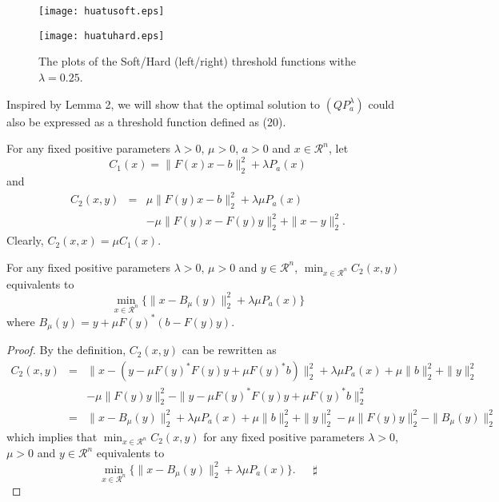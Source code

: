 \documentclass[smallextended]{svjour3}
\begin{document}
\begin{figure}[h!]
  \begin{minipage}[t]{0.5\linewidth}
  \centering
  \texttt{[image: huatusoft.eps]}
  \end{minipage}
  \begin{minipage}[t]{0.5\linewidth}
  \centering
  \texttt{[image: huatuhard.eps]}
  \end{minipage}
  \caption{The plots of the Soft/Hard (left/right) threshold functions withe $\lambda=0.25$.} \label{fig:3}
\end{figure}

Inspired by Lemma 2, we will show that the optimal solution to $(QP_{a}^{\lambda})$ could also be expressed as a threshold
function defined as (20).

For any fixed positive parameters $\lambda>0$, $\mu>0$, $a>0$ and $x\in \mathcal{R}^{n}$, let
\begin{equation}\label{r24}
C_{1}(x)=\|F(x)x-b\|_{2}^{2}+\lambda P_{a}(x)
\end{equation}
and
\begin{equation}\label{r25}
\begin{array}{llll}
C_{2}(x, y)&=&\mu\|F(y)x-b\|_{2}^{2}+\lambda\mu P_{a}(x)\\
&&-\mu\|F(y)x-F(y)y\|_{2}^{2}+\|x-y\|_{2}^{2}.
\end{array}
\end{equation}
Clearly, $C_{2}(x,x)=\mu C_{1}(x)$.
\begin{theorem}\label{th1}
For any fixed positive parameters $\lambda>0$, $\mu>0$ and $y\in \mathcal{R}^{n}$, $\displaystyle\min_{x\in \mathcal{R}^{n}}C_{2}(x,y)$
equivalents to
\begin{equation}\label{r26}
\min_{x\in \mathcal{R}^{n}}\Big\{\|x-B_{\mu}(y)\|_{2}^{2}+\lambda\mu P_{a}(x)\Big\}
\end{equation}
where $B_{\mu}(y)=y+\mu F(y)^{\ast}(b-F(y)y)$.
\end{theorem}
\begin{proof}
By the definition, $C_{2}(x,y)$ can be rewritten as
\begin{eqnarray*}
C_{2}(x,y)&=&\|x-(y-\mu F(y)^{\ast}F(y)y+\mu F(y)^{\ast}b)\|_{2}^{2}+\lambda\mu P_{a}(x)+\mu\|b\|_{2}^{2}+\|y\|_{2}^{2}\\
&&-\mu\|F(y)y\|_{2}^{2}-\|y-\mu F(y)^{\ast}F(y)y+\mu F(y)^{\ast}b\|_{2}^{2}\\
&=&\|x-B_{\mu}(y)\|_{2}^{2}+\lambda\mu P_{a}(x)+\mu\|b\|_{2}^{2}+\|y\|_{2}^{2}-\mu\|F(y)y\|_{2}^{2}-\|B_{\mu}(y)\|_{2}^{2}
\end{eqnarray*}
which implies that $\displaystyle\min_{x\in \mathcal{R}^{n}}C_{2}(x,y)$ for any fixed positive parameters $\lambda>0$, $\mu>0$ and
$y\in \mathcal{R}^{n}$ equivalents to
$$\min_{x\in \mathcal{R}^{n}}\Big\{\|x-B_{\mu}(y)\|_{2}^{2}+\lambda\mu P_{a}(x)\Big\}. \ \ \ \ \ \ \ \sharp $$
\end{proof}
\end{document}
